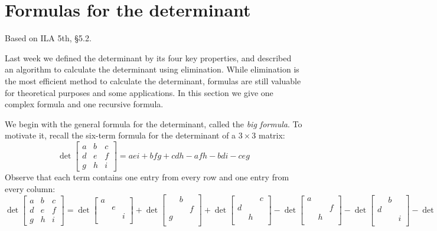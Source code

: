 \documentclass[11pt,oneside]{amsbook}
\theoremstyle{definition}
\theoremstyle{plain}
\theoremstyle{definition}
\theoremstyle{remark}
\numberwithin{equation}{section}
\numberwithin{figure}{section}
\begin{document}
\newpage
\section{Formulas for the determinant}

Based on ILA 5th, \S 5.2.

Last week we defined the determinant by its four key properties, and described an algorithm to calculate the determinant using elimination. While elimination is the most efficient method to calculate the determinant, formulas are still valuable for theoretical purposes and some applications. In this section we give one complex formula and one recursive formula.

We begin with the general formula for the determinant, called the \emph{big formula}. To motivate it, recall the six-term formula for the determinant of a $3\times3$ matrix:
\[\det\begin{bmatrix}a&b&c\\d&e&f\\g&h&i\end{bmatrix}
  =aei+bfg+cdh-afh-bdi-ceg
\]
Observe that each term contains one entry from every row and one entry from every column:
\smaller\smaller\smaller
\[\det\begin{bmatrix}a&b&c\\d&e&f\\g&h&i\end{bmatrix}
  =\det\begin{bmatrix}a\\&e\\&&i\\\end{bmatrix}
  +\det\begin{bmatrix}&b\\&&f\\g\\\end{bmatrix}
  +\det\begin{bmatrix}&&c\\d\\&h\\\end{bmatrix}
  -\det\begin{bmatrix}a\\&&f\\&h\\\end{bmatrix}
  -\det\begin{bmatrix}&b\\d\\&&i\\\end{bmatrix}
  -\det\begin{bmatrix}&&c\\&e\\g\\\end{bmatrix}
\]
\end{document}
